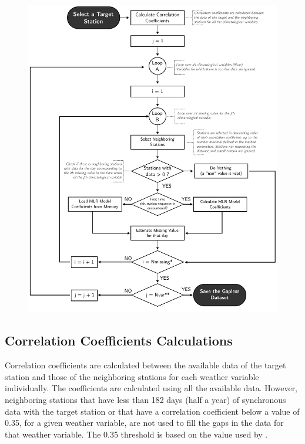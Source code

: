 \documentclass[TechnicalNoteMeteo.tex]{subfiles}
\begin{document}
\begin{figure}[!p]
    \centering
    \includegraphics[width=\textwidth]{img/Flowchart-filling_missing_weather.pdf} 
    \caption{}
    \label{fig:fillworker_flowchart}
\end{figure}

\subsection{Correlation Coefficients Calculations}

Correlation coefficients are calculated between the available data of the target station and those of the neighboring stations for each weather variable individually. The coefficients are calculated using all the available data. However, neighboring stations that have less than 182 days (half a year) of synchronous data with the target station or that have a correlation coefficient below a value of 0.35, for a given weather variable, are not used to fill the gaps in the data for that weather variable. The 0.35 threshold is based on the value used by \cite{eischeid_creating_2000}. 
\end{document}
